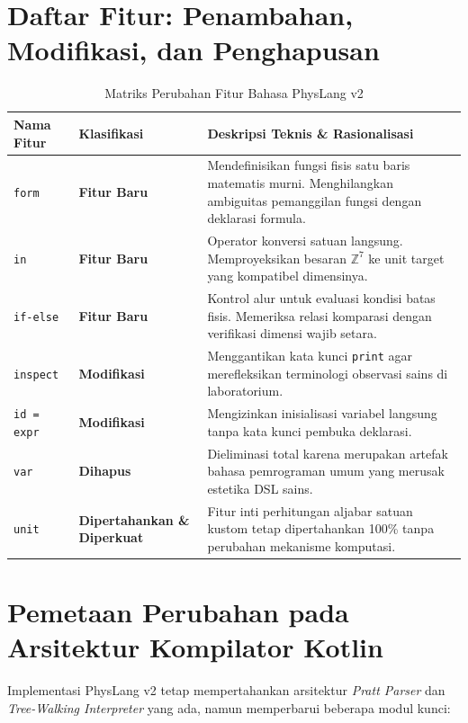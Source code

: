 \documentclass[11pt,a4paper]{article}
\begin{document}
\section{Daftar Fitur: Penambahan, Modifikasi, dan Penghapusan}

\begin{table}[h]
\centering
\small
\begin{tabularx}{\textwidth}{lp{4.2cm}X}
\toprule
\textbf{Nama Fitur} & \textbf{Klasifikasi} & \textbf{Deskripsi Teknis \& Rasionalisasi} \\
\midrule
\texttt{form} & \textbf{Fitur Baru} & Mendefinisikan fungsi fisis satu baris matematis murni. Menghilangkan ambiguitas pemanggilan fungsi dengan deklarasi formula. \\
\texttt{in} & \textbf{Fitur Baru} & Operator konversi satuan langsung. Memproyeksikan besaran $\mathbb{Z}^7$ ke unit target yang kompatibel dimensinya. \\
\texttt{if-else} & \textbf{Fitur Baru} & Kontrol alur untuk evaluasi kondisi batas fisis. Memeriksa relasi komparasi dengan verifikasi dimensi wajib setara. \\
\texttt{inspect} & \textbf{Modifikasi} & Menggantikan kata kunci \texttt{print} agar merefleksikan terminologi observasi sains di laboratorium. \\
\texttt{id = expr} & \textbf{Modifikasi} & Mengizinkan inisialisasi variabel langsung tanpa kata kunci pembuka deklarasi. \\
\texttt{var} & \textbf{Dihapus} & Dieliminasi total karena merupakan artefak bahasa pemrograman umum yang merusak estetika DSL sains. \\
\texttt{unit} & \textbf{Dipertahankan \& Diperkuat} & Fitur inti perhitungan aljabar satuan kustom tetap dipertahankan 100\% tanpa perubahan mekanisme komputasi. \\
\bottomrule
\end{tabularx}
\caption{Matriks Perubahan Fitur Bahasa PhysLang v2}
\end{table}

\section{Pemetaan Perubahan pada Arsitektur Kompilator Kotlin}

Implementasi PhysLang v2 tetap mempertahankan arsitektur \textit{Pratt Parser} dan \textit{Tree-Walking Interpreter} yang ada, namun memperbarui beberapa modul kunci:
\end{document}
